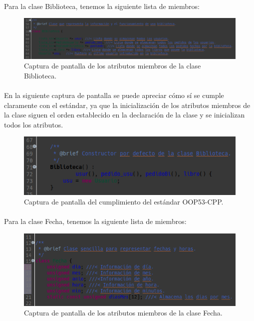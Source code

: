 				\paragraph{}Para la clase Biblioteca, tenemos la siguiente lista de miembros:
			
			\begin{figure}[H]
				\centering
				\includegraphics[scale=0.45]{img/captura5.png}
				\caption{Captura de pantalla de los atributos miembros de la clase Biblioteca.}
				\label{captura5}
			\end{figure}
		
			\paragraph{}En la siguiente captura de pantalla se puede apreciar cómo sí se cumple claramente con el estándar, ya que la inicialización de los atributos miembros de la clase siguen el orden establecido en la declaración  de la clase y se inicializan todos los atributos.
			
			\begin{figure}[H]
				\centering
				\includegraphics[scale=0.7]{img/captura6.png}
				\caption{Captura de pantalla del cumplimiento del estándar OOP53-CPP.}
				\label{captura6}
			\end{figure}
		
			\paragraph{}Para la clase Fecha, tenemos la siguiente lista de miembros:
			
			\begin{figure}[H]
				\centering
				\includegraphics[scale=0.7]{img/captura7.png}
				\caption{Captura de pantalla de los atributos miembros de la clase Fecha.}
				\label{captura7}
			\end{figure}
		
